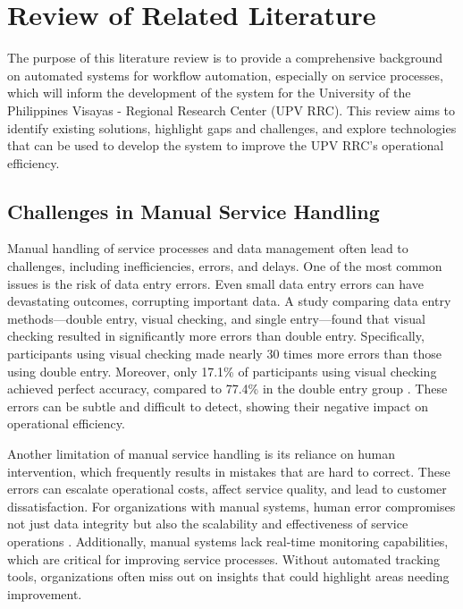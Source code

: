 \chapter{Review of Related Literature}
\label{sec:relatedlit}

The purpose of this literature review is to provide a comprehensive background on automated systems for workflow automation, especially on service processes, which will inform the development of the system for the University of the Philippines Visayas - Regional Research Center (UPV RRC). This review aims to identify existing solutions, highlight gaps and challenges, and explore technologies that can be used to develop the system to improve the UPV RRC’s operational efficiency.

\section{Challenges in Manual Service Handling}

Manual handling of service processes and data management often lead to challenges, including inefficiencies, errors, and delays. One of the most common issues is the risk of data entry errors. Even small data entry errors can have devastating outcomes, corrupting important data. A study comparing data entry methods—double entry, visual checking, and single entry—found that visual checking resulted in significantly more errors than double entry. Specifically, participants using visual checking made nearly 30 times more errors than those using double entry. Moreover, only 17.1\% of participants using visual checking achieved perfect accuracy, compared to 77.4\% in the double entry group \cite{barchard2011}. These errors can be subtle and difficult to detect, showing their negative impact on operational efficiency. 

Another limitation of manual service handling is its reliance on human intervention, which frequently results in mistakes that are hard to correct. These errors can escalate operational costs, affect service quality, and lead to customer dissatisfaction. For organizations with manual systems, human error compromises not just data integrity but also the scalability and effectiveness of service operations \cite{bitcat2023}. Additionally, manual systems lack real-time monitoring capabilities, which are critical for improving service processes. Without automated tracking tools, organizations often miss out on insights that could highlight areas needing improvement.

